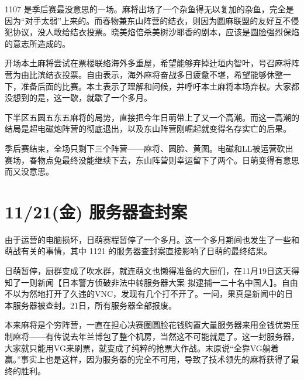 
1107 是季后赛最没意思的一场。麻将出场了一个杂鱼得无以复加的杂鱼，完全是因为“对手太弱”上来的。而春物兼东山阵营的结衣，则因为圆麻联盟的友好互不侵犯协议，没人敢给结衣投票。晓美焰倍杀美树沙耶香的剧本，应该是圆脸强烈保焰的意志所造成的。

开场本土麻将尝试在票楼联络海外多重屋，希望能够弃掉辻垣内智叶，号召麻将阵营为由比滨结衣投票。自由表示，海外麻将奋战多日疲惫不堪，希望能够休整一下，准备后面的比赛。本土表示了理解和问候，并呼吁本土麻将本场弃权。大家都没想到的是，这一歇，就歇了一个多月。

下半区五圆五东五麻将的局势，直接把今年日萌带上了又一个高潮。而这一高潮的结局是超电磁炮阵营的彻底退出，以及东山阵营刚崛起就变得名存实亡的后果。

季后赛结束，全场只剩下三个阵营——麻将、圆脸、黄图。电磁和LL被运营砍出赛场，春物点兔最终没能继续下去，东山阵营则幸运留下了两个。日萌变得有意思而又没意思。

\section{11/21(金) 服务器查封案}

由于运营的电脑损坏，日萌赛程暂停了一个多月。这一个多月期间也发生了一些和萌战有关的事情，其中 1121 的服务器查封案直接影响了日萌的最终结果。

日萌暂停，厨群变成了吹水群，就连萌文也懒得准备的大厨们，在11月19日这天得知了一则新闻【日本警方侦破非法中转服务器大案 拟逮捕一二十名中国人】。自由不以为然地打开了久违的VNC，发现有几个打不开了。一问，果真是新闻中的日本服务器被查封。21日，所有服务器全部报废。

本来麻将是个穷阵营，一直在担心决赛圈圆脸花钱购置大量服务器来用金钱优势压制麻将——有传说去年兰博包了整个机房，当然这不可能就是了。这一封服务器，大家就只能用VG来刷票，就变成了纯粹的抢票大作战。末原说“全靠VG躺着赢。”事实上也是这样，因为服务器的完全不可用，导致了技术领先的麻将获得了最终的胜利。

